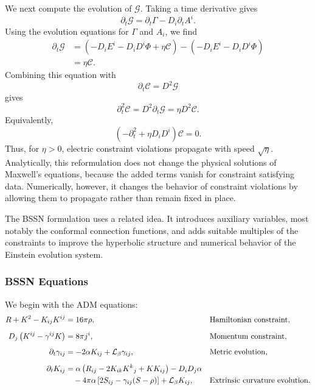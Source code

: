 We next compute the evolution of $\mathcal{G}$. Taking a time derivative gives
\begin{equation}
\partial_t\mathcal{G}
=
\partial_t\Gamma
-
D_i\partial_t A^i .
\end{equation}
Using the evolution equations for $\Gamma$ and $A_i$, we find
\begin{align}
\partial_t\mathcal{G}
&=
\left(
-D_iE^i
-
D_iD^i\Phi
+
\eta\mathcal{C}
\right)
-
\left(
-D_iE^i
-
D_iD^i\Phi
\right)
\\
&=
\eta\mathcal{C}.
\end{align}
Combining this equation with
\begin{equation}
\partial_t\mathcal{C}
=
D^2\mathcal{G}
\end{equation}
gives
\begin{equation}
\partial_t^2\mathcal{C}
=
D^2\partial_t\mathcal{G}
=
\eta D^2\mathcal{C}.
\end{equation}
Equivalently,
\begin{equation}
\boxed{
\left(
-\partial_t^2+\eta D_iD^i
\right)
\mathcal{C}
=
0
} .
\end{equation}
Thus, for $\eta>0$, electric constraint violations propagate with speed $\sqrt{\eta}$. Analytically, this reformulation does not change the physical solutions of Maxwell's equations, because the added terms vanish for constraint satisfying data. Numerically, however, it changes the behavior of constraint violations by allowing them to propagate rather than remain fixed in place.

The BSSN formulation uses a related idea. It introduces auxiliary variables, most notably the conformal connection functions, and adds suitable multiples of the constraints to improve the hyperbolic structure and numerical behavior of the Einstein evolution system.

\subsubsection{BSSN Equations}

We begin with the ADM equations:
\begin{align}
R + K^2 - K_{ij}K^{ij}
&=
16\pi \rho,
&&\text{Hamiltonian constraint},
\\[0.5em]
D_j \left( K^{ij} - \gamma^{ij}K \right)
&=
8\pi j^i,
&&\text{Momentum constraint},
\\[0.5em]
\partial_t \gamma_{ij}
&=
-2\alpha K_{ij}
+
\mathcal{L}_{\beta}\gamma_{ij},
&&\text{Metric evolution},
\\[0.5em]
\partial_t K_{ij}
&=
\alpha
\left(
R_{ij}
- 2K_{ik}K^k{}_{j}
+ K K_{ij}
\right)
- D_i D_j \alpha
\notag \\
&\quad
- 4\pi \alpha
\left[
2S_{ij}
-
\gamma_{ij}(S-\rho)
\right]
+
\mathcal{L}_{\beta}K_{ij},
&&\text{Extrinsic curvature evolution}.
\end{align}

